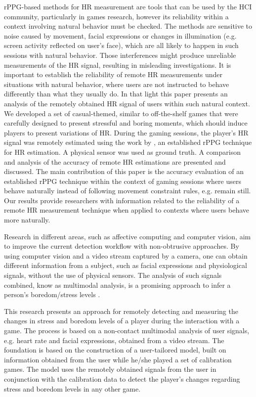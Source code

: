 rPPG-based methods for HR measurement are tools that can be used by the HCI community, particularly in games research, however its reliability within a context involving natural behavior must be checked. The methods are sensitive to noise caused by movement, facial expressions or changes in illumination (e.g. screen activity reflected on user's face), which are all likely to happen in such sessions with natural behavior. Those interferences might produce unreliable measurements of the HR signal, resulting in misleading investigations. It is important to establish the reliability of remote HR measurements under situations with natural behavior, where users are not instructed to behave differently than what they usually do. In that light this paper presents an analysis of the remotely obtained HR signal of users within such natural context. We developed a set of casual-themed, similar to off-the-shelf games that were carefully designed to present stressful and boring moments, which should induce players to present variations of HR. During the gaming sessions, the player's HR signal was remotely estimated using the work by \textcite{poh2011advancements}, an established rPPG technique for HR estimation. A physical sensor was used as ground truth. A comparison and analysis of the accuracy of remote HR estimations are presented and discussed. The main contribution of this paper is the accuracy evaluation of an established rPPG technique within the context of gaming sessions where users behave naturally instead of following movement constraint rules, e.g. remain still. Our results provide researchers with information related to the reliability of a remote HR measurement technique when applied to contexts where users behave more naturally.


Research in different areas, such as affective computing and computer vision, aim to improve the current detection workflow with non-obtrusive approaches. By using computer vision and a video stream captured by a camera, one can obtain different information from a subject, such as facial expressions and physiological signals, without the use of physical sensors. The analysis of such signals combined, know as multimodal analysis, is a promising approach to infer a person's boredom/stress levels \parencite{kukolja2014comparative}.

This research presents an approach for remotely detecting and measuring the changes in stress and boredom levels of a player during the interaction with a game. The process is based on a non-contact multimodal analysis of user signals, e.g. heart rate and facial expressions, obtained from a video stream. The foundation is based on the construction of a user-tailored model, built on information obtained from the user while he/she played a set of calibration games. The model uses the remotely obtained signals from the user in conjunction with the calibration data to detect the player's changes regarding stress and boredom levels in any other game.


